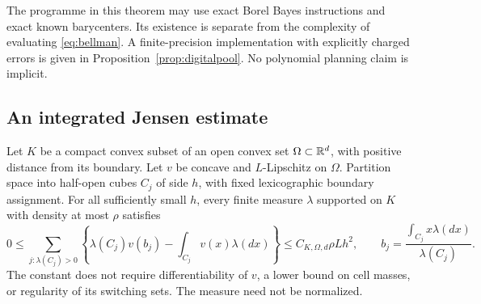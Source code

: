 The programme in this theorem may use exact Borel Bayes instructions and exact known barycenters. Its existence is separate from the complexity of evaluating \eqref{eq:bellman}. A finite-precision implementation with explicitly charged errors is given in Proposition~\ref{prop:digitalpool}. No polynomial planning claim is implicit.

\subsection{An integrated Jensen estimate}
\begin{lemma}\label{lem:integrated}
Let $K$ be a compact convex subset of an open convex set $\Omega\subset\mathbb R^d$, with positive distance from its boundary. Let $v$ be concave and $L$-Lipschitz on $\Omega$. Partition space into half-open cubes $C_j$ of side $h$, with fixed lexicographic boundary assignment. For all sufficiently small $h$, every finite measure $\lambda$ supported on $K$ with density at most $\rho$ satisfies
\begin{equation}\label{eq:jensenbound}
 0\le\sum_{j:\lambda(C_j)>0}
 \left\{\lambda(C_j)v(b_j)-\int_{C_j}v(x)\lambda(dx)\right\}
 \le C_{K,\Omega,d}\rho Lh^2,
 \qquad b_j=\frac{\int_{C_j}x\lambda(dx)}{\lambda(C_j)}.
\end{equation}
The constant does not require differentiability of $v$, a lower bound on cell masses, or regularity of its switching sets. The measure need not be normalized.
\end{lemma}

